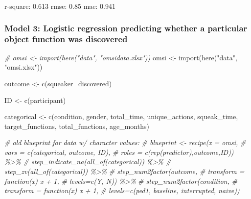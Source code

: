 \documentclass[
  english,
  man]{apa6}
\newenvironment{Shaded}{\begin{snugshade}}{\end{snugshade}}
\newcommand{\CommentTok}[1]{\textcolor[rgb]{0.56,0.35,0.01}{\textit{#1}}}
\newcommand{\FunctionTok}[1]{\textcolor[rgb]{0.00,0.00,0.00}{#1}}
\newcommand{\NormalTok}[1]{#1}
\newcommand{\OtherTok}[1]{\textcolor[rgb]{0.56,0.35,0.01}{#1}}
\newcommand{\StringTok}[1]{\textcolor[rgb]{0.31,0.60,0.02}{#1}}
\begin{document}
r-square: 0.613
rmse: 0.85
mae: 0.941

\hypertarget{model-3-logistic-regression-predicting-whether-a-particular-object-function-was-discovered}{%
\subsubsection{Model 3: Logistic regression predicting whether a particular object function was discovered}\label{model-3-logistic-regression-predicting-whether-a-particular-object-function-was-discovered}}

\begin{Shaded}
\begin{Highlighting}[]
\CommentTok{\# omsi \textless{}{-} import(here("data", "omsidata.xlsx"))}
\NormalTok{omsi }\OtherTok{\textless{}{-}} \FunctionTok{import}\NormalTok{(}\FunctionTok{here}\NormalTok{(}\StringTok{"data"}\NormalTok{, }\StringTok{"omsi.xlsx"}\NormalTok{))}

\NormalTok{outcome }\OtherTok{\textless{}{-}} \FunctionTok{c}\NormalTok{(}\StringTok{\textquotesingle{}squeaker\_discovered\textquotesingle{}}\NormalTok{)}

\NormalTok{ID }\OtherTok{\textless{}{-}} \FunctionTok{c}\NormalTok{(}\StringTok{\textquotesingle{}participant\textquotesingle{}}\NormalTok{)}

\NormalTok{categorical }\OtherTok{\textless{}{-}} \FunctionTok{c}\NormalTok{(}\StringTok{\textquotesingle{}condition\textquotesingle{}}\NormalTok{, }\StringTok{\textquotesingle{}gender\textquotesingle{}}\NormalTok{, }\StringTok{\textquotesingle{}total\_time\textquotesingle{}}\NormalTok{, }\StringTok{\textquotesingle{}unique\_actions\textquotesingle{}}\NormalTok{, }\StringTok{\textquotesingle{}squeak\_time\textquotesingle{}}\NormalTok{, }\StringTok{\textquotesingle{}target\_functions\textquotesingle{}}\NormalTok{, }\StringTok{\textquotesingle{}total\_functions\textquotesingle{}}\NormalTok{, }\StringTok{\textquotesingle{}age\_months\textquotesingle{}}\NormalTok{)}

\CommentTok{\# old blueprint for data w/ character values:}
\CommentTok{\# blueprint \textless{}{-} recipe(x  = omsi,}
\CommentTok{\#                    vars  = c(categorical, outcome, ID),}
\CommentTok{\#                    roles = c(rep(\textquotesingle{}predictor\textquotesingle{}),\textquotesingle{}outcome\textquotesingle{},\textquotesingle{}ID\textquotesingle{})) \%\textgreater{}\%}
\CommentTok{\#  step\_indicate\_na(all\_of(categorical)) \%\textgreater{}\%}
\CommentTok{\#  step\_zv(all\_of(categorical)) \%\textgreater{}\%}
\CommentTok{\#    step\_num2factor(outcome,}
\CommentTok{\#                  transform = function(x) x + 1,}
\CommentTok{\#                  levels=c(\textquotesingle{}Y\textquotesingle{}, \textquotesingle{}N\textquotesingle{})) \%\textgreater{}\%}
\CommentTok{\#  step\_num2factor(condition, }
\CommentTok{\#                  transform = function(x) x + 1,}
\CommentTok{\#                  levels=c(\textquotesingle{}ped1\textquotesingle{}, \textquotesingle{}baseline\textquotesingle{}, \textquotesingle{}interrupted\textquotesingle{}, \textquotesingle{}naive\textquotesingle{}))}
 

\end{Highlighting}
\end{Shaded}
\end{document}

